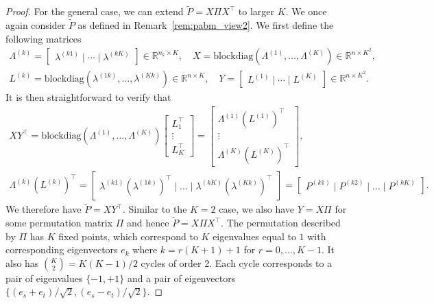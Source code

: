 \documentclass[12pt]{article}
\begin{document}
\begin{proof}
For the general case, we can extend $\tilde{P} = X \Pi X^\top$ to larger $K$. 
We once again consider $\tilde{P}$ as defined in
Remark~\ref{rem:pabm_view2}.  
We first define the following matrices
\begin{gather}
\label{eq:xy}
\Lambda^{(k)} = \begin{bmatrix} \lambda^{(k1)} \mid \cdots \mid \lambda^{(kK)} \end{bmatrix}
\in \mathbb{R}^{n_k \times K}, \quad
X = \mathrm{blockdiag}(\Lambda^{(1)}, \dots, \Lambda^{(K)}) \in
\mathbb{R}^{n \times K^2}, \\
L^{(k)} = \mathrm{blockdiag}(\lambda^{(1k)}, \dots, \lambda^{(Kk)}) \in
\mathbb{R}^{n \times K}, \quad
Y = \begin{bmatrix} L^{(1)} \mid \cdots \mid L^{(K)} \end{bmatrix} \in
\mathbb{R}^{n \times K^2}.
\end{gather}
It is then straightforward to verify that
\begin{gather*}
  XY^{\top} = \mathrm{blockdiag}(\Lambda^{(1)}, \dots,
\Lambda^{(K)}) \begin{bmatrix} L_1^{\top} \\ \vdots \\
  L_{K}^{\top} \end{bmatrix} = \begin{bmatrix} \Lambda^{(1)}
  (L^{(1)})^{\top} \\ \vdots \\
  \Lambda^{(K)} (L^{(K)})^{\top} \end{bmatrix}, \\
\Lambda^{(k)} (L^{(k)})^{\top} = \begin{bmatrix} \lambda^{(k1)}
  (\lambda^{(1k)})^{\top} \mid \dots \mid \lambda^{(kK)}
  (\lambda^{(Kk)})^{\top} \end{bmatrix} = \begin{bmatrix} P^{(k1)}
  \mid P^{(k2)} \mid \dots \mid P^{(kK)} \end{bmatrix}.
\end{gather*}
We therefore have $\tilde{P} = X Y^\top$. 
Similar to the $K = 2$ case, we also have $Y = X \Pi$ for some permutation matrix
$\Pi$ and hence $\tilde{P} = X \Pi X^\top$.
The permutation described by $\Pi$ has $K$ fixed points, which correspond to
$K$ eigenvalues equal to $1$ with corresponding eigenvectors $e_k$ where
$k = r (K + 1) + 1$ for $r = 0, ..., K - 1$. It also has
$\binom{K}{2} = K (K - 1) / 2$ cycles of order $2$. Each cycle corresponds to
a pair of eigenvalues $\{-1,+1\}$ and a pair of eigenvectors
$\{(e_s + e_t)/\sqrt{2},(e_s - e_t)/ \sqrt{2}\}$.


\end{proof}
\end{document}

